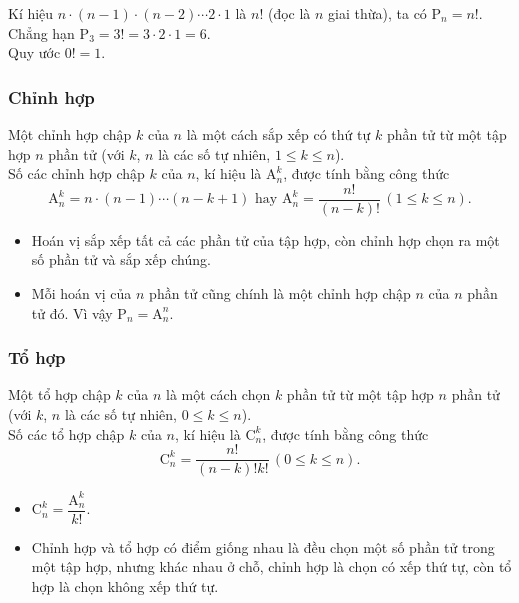 \begin{note}
	Kí hiệu $n \cdot(n-1) \cdot(n-2) \cdots 2 \cdot 1$ là $n!$ (đọc là $n$ giai thừa), ta có $\mathrm{P}_{n}=n!$. Chẳng hạn $\mathrm{P}_{3}=3!=3 \cdot 2 \cdot 1=6$.\\
	Quy ước $0 !=1$.
\end{note}

\subsubsection{Chỉnh hợp}
\begin{dn}{}
	Một chỉnh hợp chập $k$ của $n$ là một cách sắp xếp có thứ tự $k$ phần tử từ một tập hợp $n$ phần tử (với $k$, $n$ là các số tự nhiên, $1 \leq k \leq n$).\\
	Số các chỉnh hợp chập $k$ của $n$, kí hiệu là $\mathrm{A}_{n}^{k}$, được tính bằng công thức
	$$\mathrm{A}_{n}^{k}=n \cdot(n-1) \cdots(n-k+1) \text { hay } \mathrm{A}_{n}^{k}=\dfrac{n!}{(n-k)!}\,(1 \leq k \leq n).$$
\end{dn}

\begin{note}
	\begin{itemize}
		\item Hoán vị sắp xếp tất cả các phần tử của tập hợp, còn chỉnh hợp chọn ra một số phần tử và sắp xếp chúng.
		\item Mỗi hoán vị của $n$ phần tử cũng chính là một chỉnh hợp chập $n$ của $n$ phần tử đó. Vì vậy $\mathrm{P}_{n}=\mathrm{A}_{n}^{n}$.
	\end{itemize}
\end{note}

\subsubsection{Tổ hợp}
\begin{dn}{}
	Một tổ hợp chập $k$ của $n$ là một cách chọn $k$ phần tử từ một tập hợp $n$ phần tử (với $k$, $n$ là các số tự nhiên, $0 \leq k \leq n$).\\
	Số các tổ hợp chập $k$ của $n$, kí hiệu là $\mathrm{C}_n^k$, được tính bằng công thức
	$$\mathrm{C}_n^k=\dfrac{n!}{(n-k)!k!}\,(0 \leq k \leq n).$$
\end{dn}

\begin{note}
	\begin{itemize}
		\item $\mathrm{C}_{n}^{k}=\dfrac{\mathrm{A}_{n}^{k}}{k!}$.
		\item Chỉnh hợp và tổ hợp có điểm giống nhau là đều chọn một số phần tử trong một tập hợp, nhưng khác nhau ở chỗ, chỉnh hợp là chọn có xếp thứ tự, còn tổ hợp là chọn không xếp thứ tự.
	\end{itemize}
\end{note}
